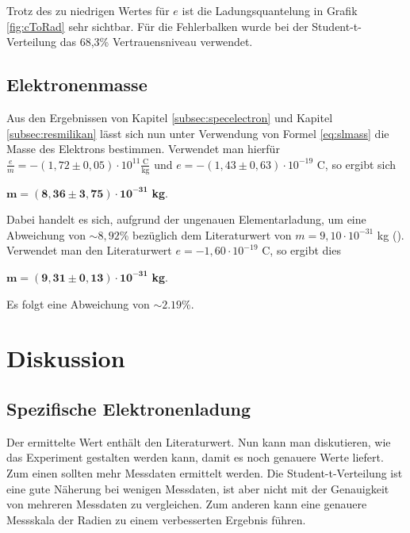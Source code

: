 \documentclass[a4paper,usenatbib]{aspdoc}
\begin{document}
            \noindent Trotz des zu niedrigen Wertes für $e$ ist die Ladungsquantelung in Grafik \ref{fig:cToRad} sehr sichtbar. Für die Fehlerbalken wurde bei der Student-t-Verteilung das 68,3\% Vertrauensniveau verwendet.  
           
            
            
        \subsection{Elektronenmasse}\label{subsec:emass}
             Aus den Ergebnissen von Kapitel \ref{subsec:specelectron} und Kapitel \ref{subsec:resmilikan} lässt sich nun unter Verwendung von Formel \ref{eq:slmass} die Masse des Elektrons bestimmen. Verwendet man hierfür $\frac{e}{m} = -(1,72 \pm 0,05) \cdot 10^{11} \frac{\mathrm{C}}{\mathrm{kg}}$ und $e = -(1,43 \pm 0,63) \cdot 10^{-19}$ C, so ergibt sich
             \begin{center}
                 $\mathbf{m = (8,36 \pm 3,75) \cdot 10^{-31}}$ \textbf{kg}.
             \end{center}
             Dabei handelt es sich, aufgrund der ungenauen Elementarladung, um eine Abweichung von $\sim8,92$\% bezüglich dem Literaturwert von $m = 9,10 \cdot 10^{-31}$ kg (\cite{demtroder}). Verwendet man den Literaturwert $e = -1,60 \cdot 10^{-19}$ C, so ergibt dies
             \begin{center}
                $\mathbf{m = (9,31 \pm 0,13) \cdot 10^{-31}}$ \textbf{kg}.
             \end{center}
            Es folgt eine Abweichung von $\sim2.19$\%.
             
            
            
            
    \section{Diskussion}\label{sec:discussion}
        \subsection{Spezifische Elektronenladung}
            Der ermittelte Wert enthält den Literaturwert. Nun kann man diskutieren, wie das Experiment gestalten werden kann, damit es noch genauere Werte liefert. Zum einen sollten mehr Messdaten ermittelt werden. Die Student-t-Verteilung ist eine gute Näherung bei wenigen Messdaten, ist aber nicht mit der Genauigkeit von mehreren Messdaten zu vergleichen. Zum anderen kann eine genauere Messskala der Radien zu einem verbesserten Ergebnis führen. 
            
\end{document}
